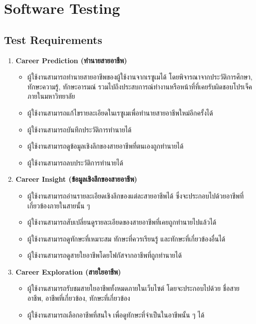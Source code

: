 \section{Software Testing}
\subsection{Test Requirements}
\begin{enumerate}
    \item \textbf{Career Prediction (ทำนายสายอาชีพ)}
          \begin{itemize}
              \item ผู้ใช้งานสามารถทำนายสายอาชีพของผู้ใช้งานจากเรซูเมได้ โดยพิจารณาจากประวัติการศึกษา, ทักษะความรู้, ทักษะอารมณ์ รวมไปถึงประสบการณ์ทำงานหรือหน้าที่ที่เคยรับผิดชอบโปรเจ็คภายในมหาวิทยาลัย
              \item ผู้ใช้งานสามารถแก้ไขรายละเอียดในเรซูเมเพื่อทำนายสายอาชีพใหม่อีกครั้งได้
              \item ผู้ใช้งานสามารถบันทึกประวัติการทำนายได้
              \item ผู้ใช้งานสามารถดูข้อมูลเชิงลึกของสายอาชีพที่ตนเองถูกทำนายได้
              \item ผู้ใช้งานสามารถลบประวัติการทำนายได้
          \end{itemize}
    \item \textbf{Career Insight (ข้อมูลเชิงลึกของสายอาชีพ)}
          \begin{itemize}
              \item ผู้ใช้งานสามารถอ่านรายละเอียดเชิงลึกของแต่ละสายอาชีพได้ ซึ่งจะประกอบไปด้วยอาชีพที่เกี่ยวข้องภายในสายนั้น ๆ
              \item ผู้ใช้งานสามารถสับเปลี่ยนดูรายละเอียดของสายอาชีพที่เคยถูกทำนายไปแล้วได้
              \item ผู้ใช้งานสามารถดูทักษะที่เหมาะสม ทักษะที่ควรเรียนรู้ และทักษะที่เกี่ยวข้องอื่นได้
              \item ผู้ใช้งานสามารถดูสายใยอาชีพโดยโฟกัสจากอาชีพที่ถูกทำนายได้
          \end{itemize}
    \item \textbf{Career Exploration (สายใยอาชีพ)}
          \begin{itemize}
              \item ผู้ใช้งานสามารถรับชมสายใยอาชีพทั้งหมดภายในเว็บไซต์ โดยจะประกอบไปด้วย ชื่อสายอาชีพ, อาชีพที่เกี่ยวข้อง, ทักษะที่เกี่ยวข้อง
              \item ผู้ใช้งานสามารถเลือกอาชีพที่สนใจ เพื่อดูทักษะที่จำเป็นในอาชีพนั้น ๆ ได้
          \end{itemize}
\end{enumerate}
\label{sec:test-subsection}
